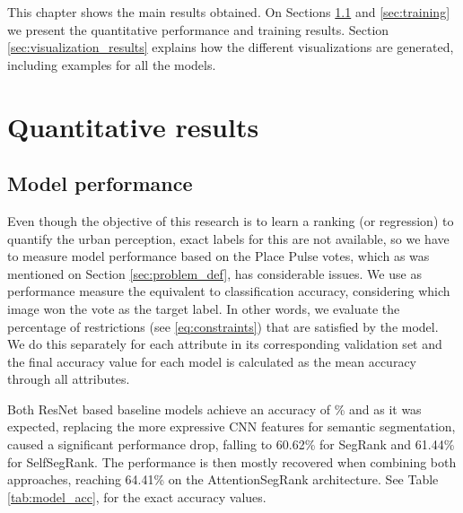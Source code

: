 This chapter shows the main results obtained. On Sections \ref{sec:perf} and \ref{sec:training} we present the quantitative
performance and training results. Section \ref{sec:visualization_results} explains how the different visualizations
are generated, including examples for all the models.

\section{Quantitative results}

\subsection{Model performance}
\label{sec:perf}
Even though the objective of this research is to learn a ranking (or regression) to
quantify the urban perception, exact labels for this are not available, so we have to measure
model performance based on the Place Pulse votes, which as was mentioned on Section
\ref{sec:problem_def}, has considerable issues. We use as performance measure the
equivalent to classification accuracy, considering which image won the vote as the target label.
In other words, we evaluate the percentage of restrictions (see \ref{eq:constraints})
that are satisfied by the model. We do this separately for each attribute in its corresponding
validation set and the final accuracy value for each model is calculated as the mean accuracy through
all attributes.

Both ResNet based baseline models achieve an accuracy of \% and
as it was expected, replacing the more expressive CNN features for semantic segmentation,
caused a significant performance drop, falling to 60.62\% for SegRank and 61.44\%
for SelfSegRank. The performance is then mostly recovered when combining both approaches,
reaching 64.41\% on the AttentionSegRank architecture. See Table \ref{tab:model_acc}, for the exact accuracy values.


